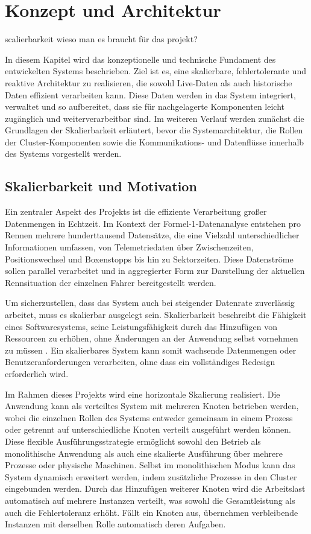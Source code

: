 \chapter{Konzept und Architektur}
scalierbarkeit wieso man es braucht für das projekt?

In diesem Kapitel wird das konzeptionelle und technische Fundament des entwickelten Systems beschrieben. 
Ziel ist es, eine skalierbare, fehlertolerante und reaktive Architektur zu realisieren, die sowohl Live-Daten 
als auch historische Daten effizient verarbeiten kann. Diese Daten werden in das System integriert, verwaltet 
und so aufbereitet, dass sie für nachgelagerte Komponenten leicht zugänglich und weiterverarbeitbar sind. 
Im weiteren Verlauf werden zunächst die Grundlagen der Skalierbarkeit erläutert, bevor die Systemarchitektur, 
die Rollen der Cluster-Komponenten sowie die Kommunikations- und Datenflüsse innerhalb des Systems vorgestellt 
werden.

\section{Skalierbarkeit und Motivation}

Ein zentraler Aspekt des Projekts ist die effiziente Verarbeitung großer Datenmengen in Echtzeit. 
Im Kontext der Formel-1-Datenanalyse entstehen pro Rennen mehrere hunderttausend Datensätze, 
die eine Vielzahl unterschiedlicher Informationen umfassen, von Telemetriedaten über Zwischenzeiten, 
Positionswechsel und Boxenstopps bis hin zu Sektorzeiten. Diese Datenströme sollen parallel verarbeitet 
und in aggregierter Form zur Darstellung der aktuellen Rennsituation der einzelnen Fahrer bereitgestellt werden.

Um sicherzustellen, dass das System auch bei steigender Datenrate zuverlässig arbeitet, muss es skalierbar ausgelegt sein. 
Skalierbarkeit beschreibt die Fähigkeit eines Softwaresystems, seine Leistungsfähigkeit durch das Hinzufügen von Ressourcen zu erhöhen, 
ohne Änderungen an der Anwendung selbst vornehmen zu müssen \parencite{bass2021}. Ein skalierbares System kann 
somit wachsende Datenmengen oder Benutzeranforderungen verarbeiten, ohne dass ein vollständiges Redesign erforderlich wird.

Im Rahmen dieses Projekts wird eine horizontale Skalierung realisiert. 
Die Anwendung kann als verteiltes System mit mehreren Knoten betrieben werden, 
wobei die einzelnen Rollen des Systems entweder gemeinsam in einem Prozess oder getrennt auf unterschiedliche 
Knoten verteilt ausgeführt werden können. Diese flexible Ausführungsstrategie ermöglicht sowohl den Betrieb 
als monolithische Anwendung als auch eine skalierte Ausführung über mehrere Prozesse oder physische Maschinen. 
Selbst im monolithischen Modus kann das System dynamisch erweitert werden, indem zusätzliche Prozesse 
in den Cluster eingebunden werden. Durch das Hinzufügen weiterer Knoten wird die Arbeitslast automatisch auf 
mehrere Instanzen verteilt, was sowohl die Gesamtleistung als auch die Fehlertoleranz erhöht. 
Fällt ein Knoten aus, übernehmen verbleibende Instanzen mit derselben Rolle automatisch deren Aufgaben.

